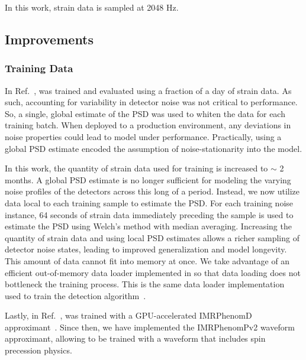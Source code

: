 \begin{refsection}
In this work, strain data is sampled at 2048 Hz.

\subsection{Improvements} \label{amp_res_sec:improvements}
\subsubsection{Training Data}
In Ref.~\cite{Chatterjee:2024pbj}, \amplfi was trained and evaluated using a fraction of a day of strain data. 
As such, accounting for variability in detector noise was not critical to performance. 
So, a single, global estimate of the PSD was used to whiten the data for each training batch. 
When deployed to a production environment, any deviations in noise properties could lead to model under performance. 
Practically, using a global PSD estimate encoded the assumption of noise-stationarity into the model. 

In this work, the quantity of strain data used for training is increased to $\sim$ 2 months. 
A global PSD estimate is no longer sufficient for modeling the varying noise profiles of the detectors across this long of a period. 
Instead, we now utilize data local to each training sample to estimate the PSD. 
For each training noise instance, 64 seconds of strain data immediately preceding the sample is used to estimate the PSD using Welch's method with median averaging. 
Increasing the quantity of strain data and using local PSD estimates allows a richer sampling of detector noise states, leading to improved generalization and model longevity. 
This amount of data cannot fit into memory at once. 
We take advantage of an efficient out-of-memory data loader implemented in \mlgw so that data loading does not bottleneck the training process. 
This is the same data loader implementation used to train the \aframe detection algorithm~\cite{aframe-methods}.

Lastly, in Ref.~\cite{Chatterjee:2024pbj}, \amplfi was trained with a GPU-accelerated IMRPhenomD approximant~\cite{Khan:2015jqa}. 
Since then, we have implemented the IMRPhenomPv2 waveform approximant, allowing \amplfi to be trained with a waveform that includes spin precession physics.


\end{refsection}
